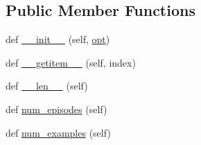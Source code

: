 \subsection*{Public Member Functions}
\begin{DoxyCompactItemize}
\item 
def \hyperlink{classparlai_1_1core_1_1pytorch__data__teacher_1_1StreamDataset_a1898c0967d1cf4eef62a70d48f35f6fb}{\+\_\+\+\_\+init\+\_\+\+\_\+} (self, \hyperlink{classparlai_1_1core_1_1pytorch__data__teacher_1_1StreamDataset_a131f7e729877877d35c4f5f74263e0d0}{opt})
\item 
def \hyperlink{classparlai_1_1core_1_1pytorch__data__teacher_1_1StreamDataset_abfcba4343d5dd9acdd213cd2289ae08e}{\+\_\+\+\_\+getitem\+\_\+\+\_\+} (self, index)
\item 
def \hyperlink{classparlai_1_1core_1_1pytorch__data__teacher_1_1StreamDataset_abbd35926c8f0dd0dd153d5f838be163c}{\+\_\+\+\_\+len\+\_\+\+\_\+} (self)
\item 
def \hyperlink{classparlai_1_1core_1_1pytorch__data__teacher_1_1StreamDataset_affcb2b9a39beb9c5504bb1051652d1e7}{num\+\_\+episodes} (self)
\item 
def \hyperlink{classparlai_1_1core_1_1pytorch__data__teacher_1_1StreamDataset_a4f2bbfd2bc046d8ff2f59153eec79b46}{num\+\_\+examples} (self)
\end{DoxyCompactItemize}
